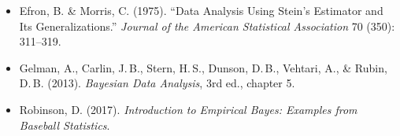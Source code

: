 \documentclass[11pt]{article}
\begin{document}
\begin{itemize}
    \item Efron, B. \& Morris, C. (1975). ``Data Analysis Using Stein's
        Estimator and Its Generalizations.'' \textit{Journal of the
        American Statistical Association} 70 (350): 311--319.
    \item Gelman, A., Carlin, J.\,B., Stern, H.\,S., Dunson, D.\,B.,
        Vehtari, A., \& Rubin, D.\,B. (2013). \textit{Bayesian Data
        Analysis}, 3rd ed., chapter 5.
    \item Robinson, D. (2017). \textit{Introduction to Empirical Bayes:
        Examples from Baseball Statistics}.
\end{itemize}
\end{document}

